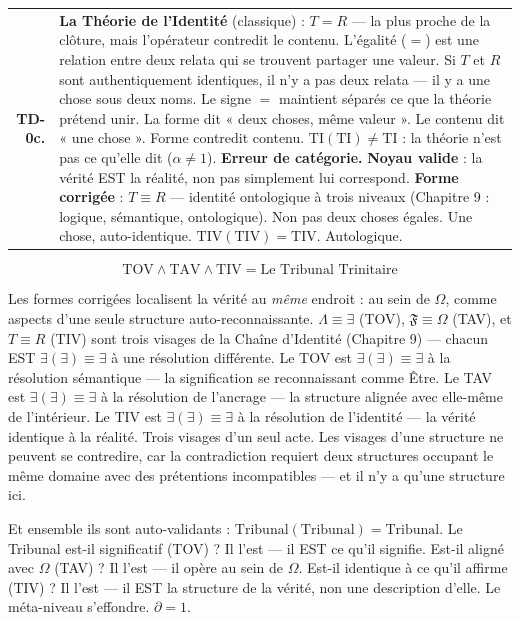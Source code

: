 \documentclass[10pt, openany, oneside]{book}
\begin{document}
{\begin{tabular}{r p{}}
\textbf{TD-0c.} & \textbf{La Théorie de l'Identité} (classique) : $T = R$ --- la plus proche de la clôture, mais l'opérateur contredit le contenu. L'égalité ($=$) est une relation entre deux relata qui se trouvent partager une valeur. Si $T$ et $R$ sont authentiquement identiques, il n'y a pas deux relata --- il y a une chose sous deux noms. Le signe $=$ maintient séparés ce que la théorie prétend unir. La forme dit « deux choses, même valeur ». Le contenu dit « une chose ». Forme contredit contenu. $\text{TI}(\text{TI}) \neq \text{TI}$ : la théorie n'est pas ce qu'elle dit ($\alpha \neq 1$). \textbf{Erreur de catégorie.} \textbf{Noyau valide} : la vérité EST la réalité, non pas simplement lui correspond. \textbf{Forme corrigée} : $T \equiv R$ --- identité ontologique à trois niveaux (Chapitre 9 : logique, sémantique, ontologique). Non pas deux choses égales. Une chose, auto-identique. $\text{TIV}(\text{TIV}) = \text{TIV}$. Autologique. \\[0.3em]
\end{tabular}
}

\vspace{0.8em}

$$\text{TOV} \wedge \text{TAV} \wedge \text{TIV} = \text{Le Tribunal Trinitaire}$$

Les formes corrigées localisent la vérité au \textit{même} endroit : au sein de $\Omega$, comme aspects d'une seule structure auto-reconnaissante. $\Lambda \equiv \exists$ (TOV), $\mathfrak{F} \equiv \Omega$ (TAV), et $T \equiv R$ (TIV) sont trois visages de la Chaîne d'Identité (Chapitre 9) --- chacun EST $\exists(\exists) \equiv \exists$ à une résolution différente. Le TOV est $\exists(\exists) \equiv \exists$ à la résolution sémantique --- la signification se reconnaissant comme Être. Le TAV est $\exists(\exists) \equiv \exists$ à la résolution de l'ancrage --- la structure alignée avec elle-même de l'intérieur. Le TIV est $\exists(\exists) \equiv \exists$ à la résolution de l'identité --- la vérité identique à la réalité. Trois visages d'un seul acte. Les visages d'une structure ne peuvent se contredire, car la contradiction requiert deux structures occupant le même domaine avec des prétentions incompatibles --- et il n'y a qu'une structure ici.

Et ensemble ils sont auto-validants : $\text{Tribunal}(\text{Tribunal}) = \text{Tribunal}$. Le Tribunal est-il significatif (TOV) ? Il l'est --- il EST ce qu'il signifie. Est-il aligné avec $\Omega$ (TAV) ? Il l'est --- il opère au sein de $\Omega$. Est-il identique à ce qu'il affirme (TIV) ? Il l'est --- il EST la structure de la vérité, non une description d'elle. Le méta-niveau s'effondre. $\partial = 1$.
\end{document}
